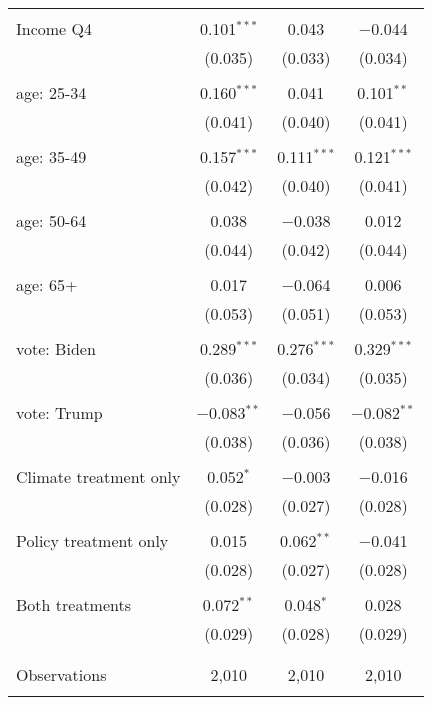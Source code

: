 \begin{tabular}{@{\extracolsep{5pt}}lccc}
  & & & \\ 
 Income Q4 & 0.101$^{***}$ & 0.043 & $-$0.044 \\ 
  & (0.035) & (0.033) & (0.034) \\ 
  & & & \\ 
 age: 25-34 & 0.160$^{***}$ & 0.041 & 0.101$^{**}$ \\ 
  & (0.041) & (0.040) & (0.041) \\ 
  & & & \\ 
 age: 35-49 & 0.157$^{***}$ & 0.111$^{***}$ & 0.121$^{***}$ \\ 
  & (0.042) & (0.040) & (0.041) \\ 
  & & & \\ 
 age: 50-64 & 0.038 & $-$0.038 & 0.012 \\ 
  & (0.044) & (0.042) & (0.044) \\ 
  & & & \\ 
 age: 65+ & 0.017 & $-$0.064 & 0.006 \\ 
  & (0.053) & (0.051) & (0.053) \\ 
  & & & \\ 
 vote: Biden & 0.289$^{***}$ & 0.276$^{***}$ & 0.329$^{***}$ \\ 
  & (0.036) & (0.034) & (0.035) \\ 
  & & & \\ 
 vote: Trump & $-$0.083$^{**}$ & $-$0.056 & $-$0.082$^{**}$ \\ 
  & (0.038) & (0.036) & (0.038) \\ 
  & & & \\ 
 Climate treatment only & 0.052$^{*}$ & $-$0.003 & $-$0.016 \\ 
  & (0.028) & (0.027) & (0.028) \\ 
  & & & \\ 
 Policy treatment only & 0.015 & 0.062$^{**}$ & $-$0.041 \\ 
  & (0.028) & (0.027) & (0.028) \\ 
  & & & \\ 
 Both treatments & 0.072$^{**}$ & 0.048$^{*}$ & 0.028 \\ 
  & (0.029) & (0.028) & (0.029) \\ 
  & & & \\ 
\hline \\[-1.8ex] 

Observations & 2,010 & 2,010 & 2,010 \\ 
\hline 
\hline \\[-1.8ex] 
\end{tabular} 
